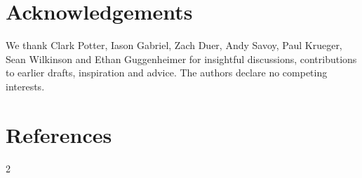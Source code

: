 \documentclass[11pt]{article}
\begin{document}
\section*{Acknowledgements}

We thank Clark Potter, Iason Gabriel, Zach Duer, Andy Savoy, Paul Krueger, Sean Wilkinson and Ethan Guggenheimer for insightful discussions, contributions to earlier drafts, inspiration and advice. The authors declare no competing interests.

\section*{References}
\renewcommand{\bibsection}{}
\begin{multicols}{2}
\renewcommand{\bibfont}{\scriptsize}
\setlength{\bibsep}{0pt plus 0.2ex}

\end{multicols}
\end{document}
